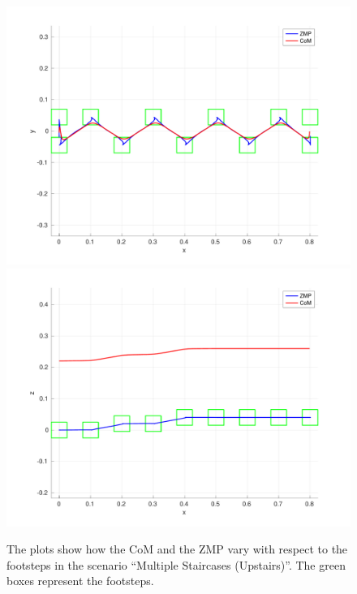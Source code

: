 \begin{figure}
  \centering
  \includegraphics[width=\textwidth]
      {figures/experiments/multiple-staircases/upstairs/xy-plot-2cm.pdf}
  \includegraphics[width=\textwidth]
      {figures/experiments/multiple-staircases/upstairs/xz-plot-2cm.pdf}
  \caption{The plots show how the CoM and the ZMP vary with respect to the
		footsteps in the scenario ``Multiple Staircases (Upstairs)''.
    The green boxes represent the footsteps.}
  \label{fig:experiments:multiple-staircases:upstairs:comzmp}
\end{figure}

